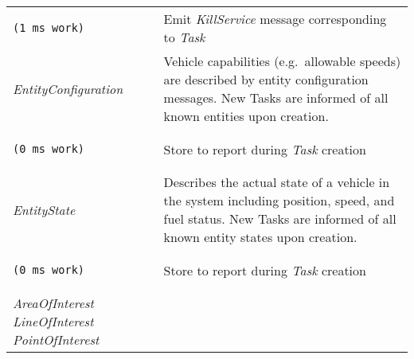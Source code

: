 \begin{longtable}[c]{@{}ll@{}}
\begin{minipage}[t]{0.29\columnwidth}
\begin{verbatim}
(1 ms work)
\end{verbatim}
\strut\end{minipage} &
\begin{minipage}[t]{0.65\columnwidth}\raggedright\strut
Emit \emph{KillService} message corresponding to \emph{Task}
\strut\end{minipage}\tabularnewline
\begin{minipage}[t]{0.29\columnwidth}\raggedright\strut
\emph{EntityConfiguration}
\strut\end{minipage} &
\begin{minipage}[t]{0.65\columnwidth}\raggedright\strut
Vehicle capabilities (e.g.~allowable speeds) are described by entity
configuration messages. New Tasks are informed of all known entities
upon creation.
\strut\end{minipage}\tabularnewline
\begin{minipage}[t]{0.29\columnwidth}\raggedright\strut
\begin{verbatim}
(0 ms work)
\end{verbatim}
\strut\end{minipage} &
\begin{minipage}[t]{0.65\columnwidth}\raggedright\strut
Store to report during \emph{Task} creation
\strut\end{minipage}\tabularnewline
\begin{minipage}[t]{0.29\columnwidth}\raggedright\strut
\emph{EntityState}
\strut\end{minipage} &
\begin{minipage}[t]{0.65\columnwidth}\raggedright\strut
Describes the actual state of a vehicle in the system including
position, speed, and fuel status. New Tasks are informed of all known
entity states upon creation.
\strut\end{minipage}\tabularnewline
\begin{minipage}[t]{0.29\columnwidth}\raggedright\strut
\begin{verbatim}
(0 ms work)
\end{verbatim}
\strut\end{minipage} &
\begin{minipage}[t]{0.65\columnwidth}\raggedright\strut
Store to report during \emph{Task} creation
\strut\end{minipage}\tabularnewline
\begin{minipage}[t]{0.29\columnwidth}\raggedright\strut
\emph{AreaOfInterest} \emph{LineOfInterest} \emph{PointOfInterest}

\end{minipage}
\end{longtable}
